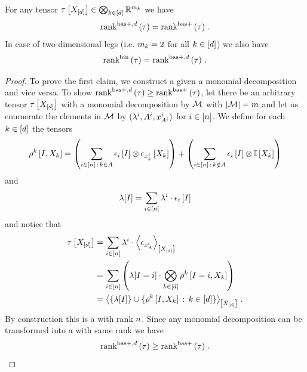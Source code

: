 \begin{theorem}
    For any tensor $\tau\left[X_{[d]}\right]\in\bigotimes_{k\in[d]} \mathbb{R}^{m_{k}}$ we have
    \begin{align*}
        \mathrm{rank}^{\mathrm{bas+},d}\left(\tau\right) = \mathrm{rank}^{\mathrm{bas+}}\left(\tau\right) \, .
    \end{align*}
    In case of two-dimensional legs (i.e. $m_{k}=2$ for all $k\in[d]$) we also have
    \begin{align*}
        \mathrm{rank}^{\mathrm{bin}}\left(\tau\right) = \mathrm{rank}^{\mathrm{bas+},d}\left(\tau\right)  \, .
    \end{align*}
\end{theorem}
\begin{proof}
    To prove the first claim, we construct a \basplusDecomposition{} given a monomial decomposition and vice versa.
    To show $\mathrm{rank}^{\mathrm{bas+},d}\left(\tau\right) \geq \mathrm{rank}^{\mathrm{bas+}}\left(\tau\right)$, let there be an arbitrary tensor $\tau\left[X_{[d]}\right]$ with a monomial decomposition by $\mathcal{M}$ with $\left|\mathcal{M}\right|=m$ and let us enumerate the elements in $\mathcal{M}$ by $(\lambda^{i}, A^{i}, x_{A^{i}}^{i})$ for $i\in[n]$.
    We define for each $k\in[d]$ the tensors
    \begin{align*}
        \rho^{k}\left[I,X_{k}\right]
        = \left( \sum_{i\in[n] \,:\, k\in A} \epsilon_{i}\left[I\right] \otimes \epsilon_{x_{k}^{i}}\left[X_{k}\right] \right)
        + \left(\sum_{i\in[n] \,:\, k\notin A} \epsilon_{i}\left[I\right] \otimes \mathbb{I}\left[X_{k}\right] \right)
    \end{align*}
    and
    \begin{align*}
        \lambda[I] = \sum_{i\in[n]} \lambda^{i} \cdot \epsilon_{i}\left[I\right]
    \end{align*}
    and notice that
    \begin{align*}
        \tau\left[X_{[d]}\right]
        & = \sum_{i\in[n]} \lambda^{i} \cdot \left\langle \epsilon_{x_{A}^{i}}\right\rangle_{\left[ X_{[d]} \right]} \\
        & = \sum_{i\in[n]} \left(  \lambda[I=i] \cdot \bigotimes_{k\in[d]} \rho^{k}\left[I=i, X_{k}\right] \right) \\
        & = \left\langle 
            \{\lambda[I]\} \cup \{\rho^{k}\left[I,X_{k}\right] \,:\, k\in[d] \}
        \right\rangle_{\left[ X_{[d]} \right]} \, .
    \end{align*}
    By construction this is a \basplusDecomposition{} with rank $n$.
    Since any monomial decomposition can be transformed into a \basplusDecomposition{} with same rank we have
    \begin{align*}
        \mathrm{rank}^{\mathrm{bas+},d}\left(\tau\right) \geq \mathrm{rank}^{\mathrm{bas+}}\left(\tau\right) \, .
    \end{align*}


\end{proof}
